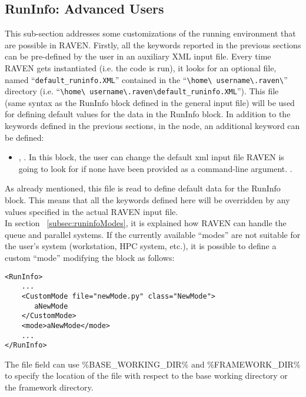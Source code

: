 \subsection{RunInfo: Advanced Users}
\label{subsec:runinfoadvanced}
This sub-section addresses some customizations of the running environment that
are possible in RAVEN.
%
Firstly, all the keywords reported in the previous sections can be pre-defined
by the user in an auxiliary XML input file.
%
Every time RAVEN gets instantiated (i.e. the code is run), it looks for an
optional file, named ``\texttt{default\_runinfo.XML}'' contained in the
``\texttt{\textbackslash home\textbackslash
username\textbackslash.raven\textbackslash}'' directory (i.e.
``\texttt{\textbackslash home\textbackslash
username\textbackslash.raven\textbackslash default\_runinfo.XML}'').
%
This file (same syntax as the RunInfo block defined in the general input file)
will be used for defining default values for the data in the RunInfo block. In
addition to the keywords defined in the previous sections, in the
 node, an additional keyword can be defined:
\begin{itemize}
\item {}, . In
this block, the user can change the default xml input file RAVEN is going to
look for if none have been provided as a command-line argument.
%
.
\end{itemize}
As already mentioned, this file is read to define default data for the RunInfo
block.
%
This means that all the keywords defined here will be overridden by any values
specified in the actual RAVEN input file.
%
\\ In section ~\ref{subsec:runinfoModes}, it is explained how RAVEN can
handle the queue and parallel systems.
%
If the currently available ``modes'' are not suitable for the user's system
(workstation, HPC system, etc.), it is possible to define a custom ``mode''
modifying the  block as follows:
\begin{lstlisting}[style=XML]
<RunInfo>
    ...
    <CustomMode file="newMode.py" class="NewMode">
       aNewMode
    </CustomMode>
    <mode>aNewMode</mode>
    ...
</RunInfo>
\end{lstlisting}

The file field can use \%BASE\_WORKING\_DIR\% and \%FRAMEWORK\_DIR\%
to specify the location of the file with respect to the base working
directory or the framework directory.

